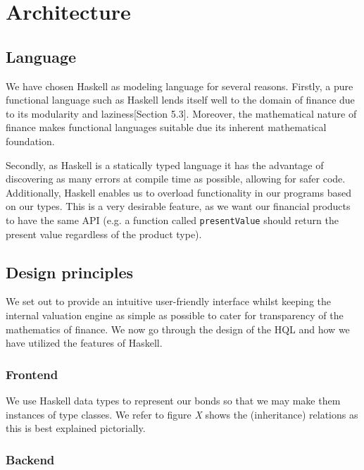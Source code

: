 \chapter{Architecture}

\section{Language}

We have chosen Haskell as modeling language for several reasons. Firstly,
a pure functional language such as Haskell lends itself well to the domain of
finance due to its modularity\cite{hughes:matters-cj} and laziness\cite{composingcontracts}[Section 5.3].
Moreover, the mathematical nature of finance makes functional languages suitable
due its inherent mathematical foundation.

Secondly, as Haskell is a statically typed language it has the advantage of
discovering as many errors at compile time as possible, allowing for safer
 code. Additionally, Haskell enables us to overload functionality in our
programs based on our types. This is a very desirable feature, as we want
 our financial products to have the same API (e.g. a function called
\texttt{presentValue} should return the present value regardless of the
product type).

\section{Design principles}

We set out to provide an intuitive user-friendly interface whilst keeping the
internal valuation engine as simple as possible to cater for transparency of
the mathematics of finance.
We now go through the design of the HQL and how we have utilized the features
of Haskell.

\subsection{Frontend}

We use Haskell data types to represent our bonds so that we may make them
instances of type classes. We refer to figure \emph{X} shows the (inheritance)
relations as this is best explained pictorially.

\subsection{Backend}

